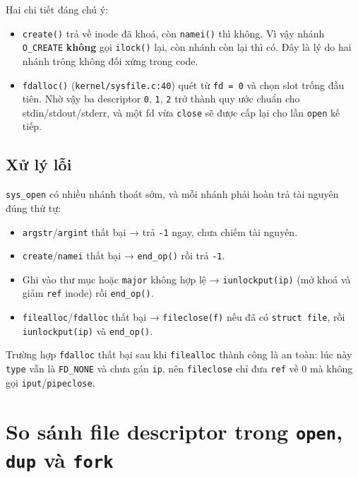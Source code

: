 Hai chi tiết đáng chú ý:

\begin{itemize}[topsep=0pt, itemsep=2.5pt, leftmargin=1.5cm]
    \item \texttt{create()} trả về inode đã khoá, còn \texttt{namei()} thì không. Vì vậy nhánh \texttt{O\_CREATE} \textbf{không} gọi \texttt{ilock()} lại, còn nhánh còn lại thì có. Đây là lý do hai nhánh trông không đối xứng trong code.
    \item \texttt{fdalloc()} (\texttt{kernel/sysfile.c:40}) quét từ \texttt{fd = 0} và chọn slot trống đầu tiên. Nhờ vậy ba descriptor \texttt{0}, \texttt{1}, \texttt{2} trở thành quy ước chuẩn cho stdin/stdout/stderr, và một fd vừa \texttt{close} sẽ được cấp lại cho lần \texttt{open} kế tiếp.
\end{itemize}

\subsection{Xử lý lỗi}

\texttt{sys\_open} có nhiều nhánh thoát sớm, và mỗi nhánh phải hoàn trả tài nguyên đúng thứ tự:

\begin{itemize}[topsep=0pt, itemsep=2.5pt, leftmargin=1.5cm]
    \item \texttt{argstr}/\texttt{argint} thất bại → trả \texttt{-1} ngay, chưa chiếm tài nguyên.
    \item \texttt{create}/\texttt{namei} thất bại → \texttt{end\_op()} rồi trả \texttt{-1}.
    \item Ghi vào thư mục hoặc \texttt{major} không hợp lệ → \texttt{iunlockput(ip)} (mở khoá và giảm \texttt{ref} inode) rồi \texttt{end\_op()}.
    \item \texttt{filealloc}/\texttt{fdalloc} thất bại → \texttt{fileclose(f)} nếu đã có \texttt{struct file}, rồi \texttt{iunlockput(ip)} và \texttt{end\_op()}.
\end{itemize}

Trường hợp \texttt{fdalloc} thất bại sau khi \texttt{filealloc} thành công là an toàn: lúc này \texttt{type} vẫn là \texttt{FD\_NONE} và chưa gán \texttt{ip}, nên \texttt{fileclose} chỉ đưa \texttt{ref} về 0 mà không gọi \texttt{iput}/\texttt{pipeclose}.

\section{So sánh file descriptor trong \texttt{open}, \texttt{dup} và \texttt{fork}}

